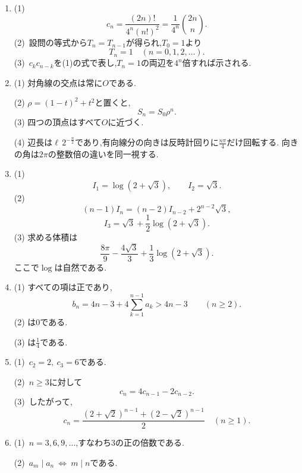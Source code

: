 \begin{enumerate}[label=\textbf{問\arabic*.},leftmargin=3.8em,format=\bookitemlink{practice-entrance}{answer}{solution}]
    (3)~奇数項の個数は$s$である.$s\ge1$のとき,$a_0,\ldots,a_{s-1}$が奇数であり,$a_s=3^s t-1$は偶数である.$s=0$のときは初項から偶数である.
  \item (1)~
    \[
      c_n=\frac{(2n)!}{4^n(n!)^2}
      =\frac1{4^n}\binom{2n}{n}.
    \]
    (2)~設問の等式から$T_n=T_{n-1}$が得られ,$T_0=1$より
    \[
      T_n=1\quad(n=0,1,2,\ldots).
    \]
    (3)~$c_kc_{n-k}$を(1)の式で表し,$T_n=1$の両辺を$4^n$倍すれば示される.
  \item (1) 対角線の交点は常に$O$である.
    \par\noindent
    (2) $\rho=(1-t)^2+t^2$と置くと,
    \[
      S_n=S_0\rho^n.
    \]
    (3) 四つの頂点はすべて$O$に近づく.
    \par\noindent
    (4) 辺長は$\ell\,2^{-\frac{n}{2}}$であり,有向線分の向きは反時計回りに$\frac{n\pi}{4}$だけ回転する.
    向きの角は$2\pi$の整数倍の違いを同一視する.
  \item (1)
    \[
      I_1=\log(2+\sqrt3),\qquad I_2=\sqrt3.
    \]
    (2)
    \[
      (n-1)I_n=(n-2)I_{n-2}+2^{n-2}\sqrt3,
    \]
    \[
      I_3=\sqrt3+\frac12\log(2+\sqrt3).
    \]
    (3) 求める体積は
    \[
      \frac{8\pi}{9}-\frac{4\sqrt3}{3}
      +\frac13\log(2+\sqrt3).
    \]
    ここで$\log$は自然である.
  \item (1) すべての項は正であり,
    \[
      b_n=4n-3+4\sum_{k=1}^{n-1}a_k>4n-3
      \qquad(n\geq2).
    \]
    (2) は$0$である.
    \par\noindent
    (3) は$\frac{1}{4}$である.
  \item (1)~$c_2=2,\ c_3=6$である.

    (2)~$n\ge3$に対して
    \[
      c_n=4c_{n-1}-2c_{n-2}.
    \]
    (3)~したがって,
    \[
      \boxed{\displaystyle
        c_n=\frac{(2+\sqrt2)^{n-1}+(2-\sqrt2)^{n-1}}2}
      \quad(n\ge1).
    \]
  \item (1)~$n=3,6,9,\ldots$,すなわち$3$の正の倍数である.

    (2)~$a_m\mid a_n\ \Longleftrightarrow\ m\mid n$である.


\end{enumerate}
